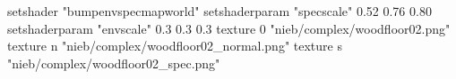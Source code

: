 setshader "bumpenvspecmapworld"
setshaderparam "specscale" 0.52 0.76 0.80
setshaderparam "envscale"  0.3 0.3 0.3
    texture 0 "nieb/complex/woodfloor02.png"
    texture n "nieb/complex/woodfloor02_normal.png"
    texture s "nieb/complex/woodfloor02_spec.png"